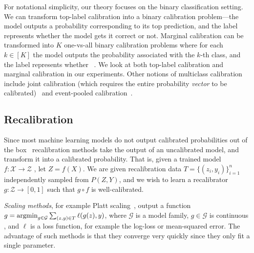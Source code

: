 For notational simplicity, our theory focuses on the binary classification setting. We can transform top-label calibration into a binary calibration problem---the model outputs a probability corresponding to its top prediction, and the label represents whether the model gets it correct or not. Marginal calibration can be transformed into $K$ one-vs-all binary calibration problems where for each $k \in [K]$ the model outputs the probability associated with the $k$-th class, and the label represents whether  ~\cite{zadrozny2002transforming}. We  look at both top-label calibration and marginal calibration in our experiments.
Other notions of multiclass calibration include joint calibration (which requires the entire probability \emph{vector} to be calibrated)~\cite{murphy1973vector, brocker2009decomposition} and event-pooled calibration~\cite{kuleshov2015calibrated}.

\subsection{Recalibration}

Since most machine learning models do not output calibrated probabilities out of the box~\cite{guo2017calibration, zadrozny2001calibrated} recalibration methods take the output of an uncalibrated model, and transform it into a calibrated probability. That is, given a trained model $f: \mathcal{X} \to \mathcal{Z}$ , let $Z = f(X)$. We are given recalibration data $T = \{ (z_i, y_i) \}_{i=1}^n$ independently sampled from  $P(Z, Y)$, and we wish to learn a recalibrator $g : \mathcal{Z} \to [0, 1]$ such that $g \circ f$ is well-calibrated.

\emph{Scaling methods}, for example Platt scaling~\cite{platt1999probabilistic}, output a function $g = \mathop{\mbox{argmin}}_{g \in \mathcal{G}} \sum_{(z, y) \in T} \ell(g(z), y)$, where $\mathcal{G}$ is a model family, $g \in \mathcal{G}$ is continuous , and $\ell$ is a loss function, for example the log-loss or mean-squared error. The advantage of such methods is that they converge very quickly since they only fit a single parameter.


